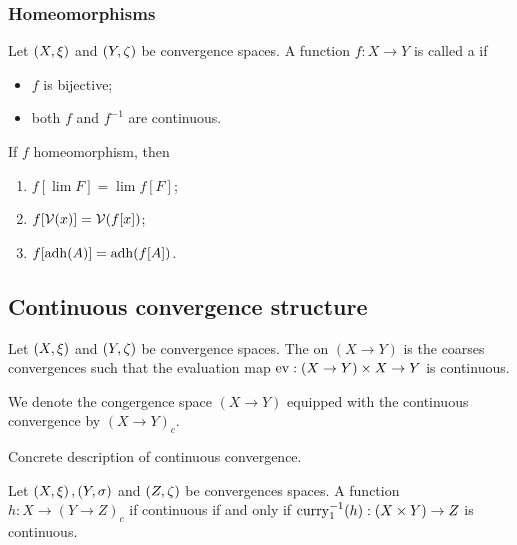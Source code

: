 \subsubsection{Homeomorphisms}
\begin{definition}
Let $\left( X,\xi \right)$ and $\left( Y,\zeta \right)$ be convergence spaces. A function $f: X\to Y$ is called a  if
\begin{itemize}
\item $f$ is bijective;
\item both $f$ and $f^{-1}$ are continuous.
\end{itemize}
\end{definition}

\begin{proposition} \label{homeomorphismPreservation}
If $f$ homeomorphism, then
\begin{enumerate}
\item $f[\lim F] = \lim f[F]$;
\item $f[\operatorname{\mathcal{V}}(x)] = \operatorname{\mathcal{V}}(f[x])$;
\item $f[\operatorname{adh}(A)] = \operatorname{adh}(f[A])$.
\end{enumerate}
\end{proposition}

\subsection{Continuous convergence structure}
\begin{definition}
Let $\left( X,\xi \right)$ and $\left( Y,\zeta \right)$ be convergence spaces. The  on $(X \to Y)$ is the coarses convergences such that the evaluation map $\operatorname{ev}: (X\to Y)\times X \to Y$ is continuous.

We denote the congergence space $(X\to Y)$ equipped with the continuous convergence by $(X\to Y)_c$.
\end{definition}

\begin{proposition}
Concrete description of continuous convergence.
\end{proposition}

\begin{proposition} \label{universalPropertyContinuousConvergence}
Let $\left( X, \xi \right), \left( Y,\sigma \right)$ and $\left( Z,\zeta \right)$ be convergences spaces. A function $h: X\to (Y \to Z)_c$ if continuous \textup{if and only if} $\operatorname{curry}_1^{-1}(h): (X\times Y)\to Z$ is continuous.
\end{proposition}

